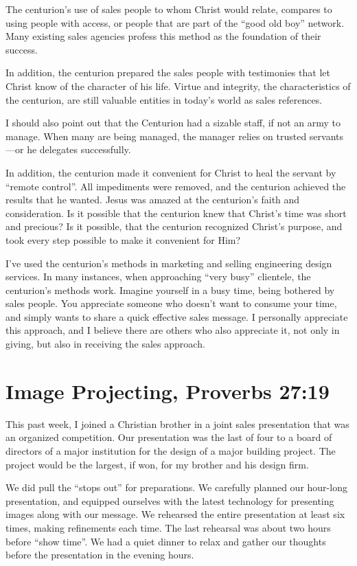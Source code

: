 \documentclass[12pt]{memoir}
\begin{document}
The centurion's use of sales people to whom Christ would relate, compares
to using people with access, or people that are part of the ``good
old boy'' network. Many existing sales agencies profess this method
as the foundation of their success.

In addition, the centurion prepared the sales people with testimonies
that let Christ know of the character of his life. Virtue and integrity,
the characteristics of the centurion, are still valuable entities
in today's world as sales references.

I should also point out that the Centurion had a sizable staff, if
not an army to manage. When many are being managed, the manager relies
on trusted servants---or he delegates successfully.

In addition, the centurion made it convenient for Christ to heal the
servant by ``remote control''. All impediments were removed, and
the centurion achieved the results that he wanted. Jesus was amazed
at the centurion's faith and consideration. Is it possible that the
centurion knew that Christ's time was short and precious? Is it possible,
that the centurion recognized Christ's purpose, and took every step
possible to make it convenient for Him?

I've used the centurion's methods in marketing and selling engineering
design services. In many instances, when approaching ``very busy''
clientele, the centurion's methods work. Imagine yourself in a busy
time, being bothered by sales people. You appreciate someone who doesn't
want to consume your time, and simply wants to share a quick effective
sales message. I personally appreciate this approach, and I believe
there are others who also appreciate it, not only in giving, but also
in receiving the sales approach.

\section{Image Projecting, Proverbs 27:19}

This past week, I joined a Christian brother in a joint sales presentation
that was an organized competition. Our presentation was the last of
four to a board of directors of a major institution for the design
of a major building project. The project would be the largest, if
won, for my brother and his design firm.

We did pull the ``stops out'' for preparations. We carefully planned
our hour-long presentation, and equipped ourselves with the latest
technology for presenting images along with our message. We rehearsed
the entire presentation at least six times, making refinements each
time. The last rehearsal was about two hours before ``show time''.
We had a quiet dinner to relax and gather our thoughts before the
presentation in the evening hours.
\end{document}
